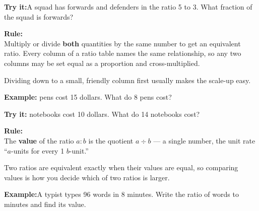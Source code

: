 \documentclass[12pt]{article}
\begin{document}
\begin{tryitbox}
\textbf{Try it:}\quad A squad has forwards and defenders in the ratio 5 to 3.
What fraction of the squad is forwards?\\[2pt]
\end{tryitbox}


\begin{formulabox}
\textbf{Rule:}\\[4pt]
Multiply or divide \textbf{both} quantities by the same number to get an
equivalent ratio. Every column of a ratio table names the same relationship, so
any two columns may be set equal as a proportion and cross-multiplied.\par
\smallskip
Dividing down to a small, friendly column first usually makes the scale-up
easy.
\end{formulabox}

\begin{examplebox}
\textbf{Example:} pens cost 15 dollars. What do 8 pens cost?
\end{examplebox}

\begin{tryitbox}
\textbf{Try it:} notebooks cost 10 dollars. What do 14 notebooks
cost?\\[2pt]
\end{tryitbox}


\begin{formulabox}
\textbf{Rule:}\\[4pt]
The \textbf{value} of the ratio $a:b$ is the quotient $a \div b$ --- a single
number, the unit rate ``$a$-units for every 1 $b$-unit.''\par
\smallskip
Two ratios are equivalent exactly when their values are equal, so comparing
values is how you decide which of two ratios is larger.
\end{formulabox}

\begin{examplebox}
\textbf{Example:}\quad A typist types 96 words in 8 minutes. Write the ratio of
words to minutes and find its value.
\end{examplebox}
\end{document}
